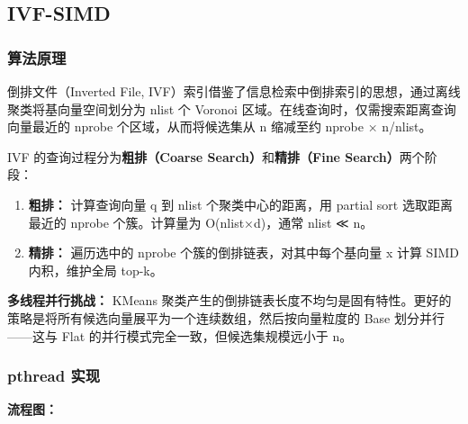 \documentclass[a4paper]{article}
\begin{document}
\subsection{IVF-SIMD}

\subsubsection{算法原理}

倒排文件（Inverted File, IVF）索引借鉴了信息检索中倒排索引的思想，通过离线聚类将基向量空间划分为 nlist 个 Voronoi 区域。在线查询时，仅需搜索距离查询向量最近的 nprobe 个区域，从而将候选集从 n 缩减至约 nprobe × n/nlist。

IVF 的查询过程分为\textbf{粗排（Coarse Search）}和\textbf{精排（Fine Search）}两个阶段：

\begin{enumerate}
\item \textbf{粗排：} 计算查询向量 q 到 nlist 个聚类中心的距离，用 partial sort 选取距离最近的 nprobe 个簇。计算量为 O(nlist×d)，通常 nlist ≪ n。
\item \textbf{精排：} 遍历选中的 nprobe 个簇的倒排链表，对其中每个基向量 x 计算 SIMD 内积，维护全局 top-k。
\end{enumerate}

\textbf{多线程并行挑战：} KMeans 聚类产生的倒排链表长度不均匀是固有特性。更好的策略是将所有候选向量展平为一个连续数组，然后按向量粒度的 Base 划分并行——这与 Flat 的并行模式完全一致，但候选集规模远小于 n。

\subsubsection{pthread 实现}

\textbf{流程图：}
\end{document}
